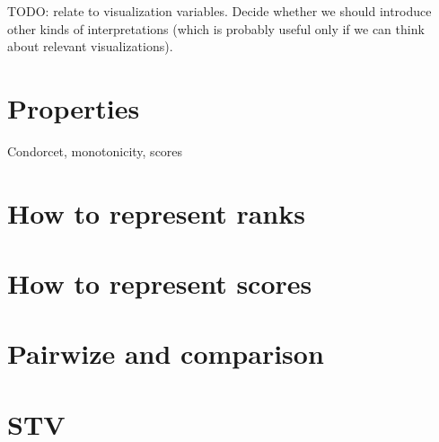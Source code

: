 \documentclass[version=last, pagesize, twoside=off, bibliography=totoc, DIV=calc, fontsize=12pt, a4paper, french, english]{scrartcl}
\begin{document}
TODO: relate to visualization variables. Decide whether we should introduce other kinds of interpretations (which is probably useful only if we can think about relevant visualizations).

\section{Properties}
Condorcet, monotonicity, scores
\section{How to represent ranks}
\section{How to represent scores}
\section{Pairwize and comparison}
\section{STV}


\end{document}

